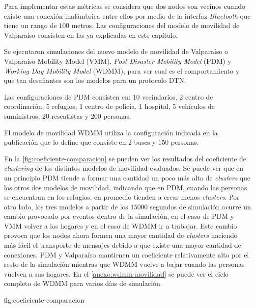 Para implementar estas métricas se considera que dos nodos son vecinos cuando
existe una conexión inalámbrica entre ellos por medio de la interfaz
\textit{Bluetooth} que tiene un rango de $100$ metros. Las configuraciones del
modelo de movilidad de Valparaíso consisten en las ya explicadas en este
capítulo.


Se ejecutaron simulaciones del nuevo modelo de movilidad de Valparaíso o
Valparaíso Mobility Model (VMM), \textit{Post-Disaster Mobility Model} (PDM) y
\textit{Working Day Mobility Model} (WDMM), para ver cual es el comportamiento y
que tan desafiantes son los modelos para un protocolo DTN.

Las configuraciones de PDM consisten en: 10 vecindarios, 2 centro
de coordinación, 5 refugios, 1 centro de policía, 1 hospital, 5 vehículos de
suministros, 20 rescatistas y 200 personas.

El modelo de movilidad WDMM utiliza la configuración indicada en la publicación
que lo define que consiste en 2 buses y 150 personas.






En la \ref{fig:coeficiente-comparacion} se pueden ver los resultados del
coeficiente de \textit{clustering} de los distintos modelos de movilidad
evaluados. Se puede ver que en un principio PDM tiende a formar una cantidad un
poco más alta de \textit{clusters} que los otros dos modelos de movilidad,
indicando que en PDM, cuando las personas se encuentran en los refugios, en
promedio tienden a crear menos \textit{clusters}. Por otro lado, los tres modelos a
partir de los $15000$ segundos de simulación ocurre un cambio provocado por
eventos dentro de la simulación, en el caso de PDM y VMM volver a los
hogares y en el caso de WDMM ir a trabajar. Este cambio provoca que los nodos
ahora formen una mayor cantidad de \textit{clusters} haciendo más fácil el
transporte de mensajes debido a que existe una mayor cantidad de conexiones.
PDM y Valparaíso mantienen un coeficiente relativamente alto por el resto de la
simulación mientras que WDMM vuelve a bajar cuando las personas vuelven a sus
hogares. En el \ref{anexo:wdmm-movilidad} se puede ver el ciclo completo de WDMM
para varios días de simulación.


{fig:coeficiente-comparacion}



